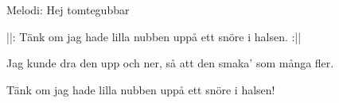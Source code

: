 \begin{song}

\begin{songmeta}
Melodi: Hej tomtegubbar
\end{songmeta}

\begin{songtext}
||: Tänk om jag hade lilla nubben
uppå ett snöre i halsen. :||

Jag kunde dra den upp och ner,
så att den smaka' som många fler.

Tänk om jag hade lilla nubben
uppå ett snöre i halsen!
\end{songtext}

\end{song}
